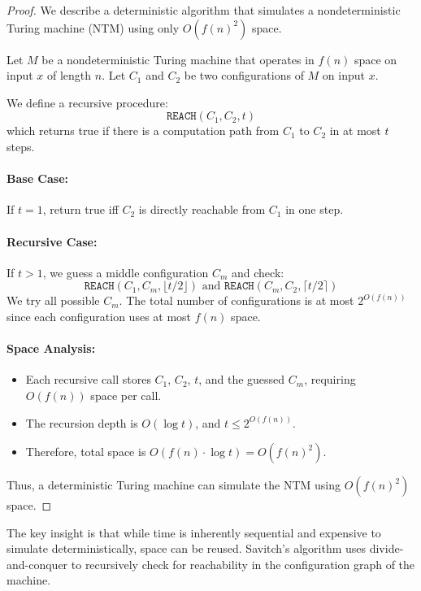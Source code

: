 \begin{proof}
We describe a deterministic algorithm that simulates a nondeterministic Turing machine (NTM) using only $O(f(n)^2)$ space.

Let $M$ be a nondeterministic Turing machine that operates in $f(n)$ space on input $x$ of length $n$. Let $C_1$ and $C_2$ be two configurations of $M$ on input $x$.

We define a recursive procedure:
\[
\texttt{REACH}(C_1, C_2, t)
\]
which returns true if there is a computation path from $C_1$ to $C_2$ in at most $t$ steps.

\paragraph{Base Case:} If $t = 1$, return true iff $C_2$ is directly reachable from $C_1$ in one step.

\paragraph{Recursive Case:} If $t > 1$, we guess a middle configuration $C_m$ and check:
\[
\texttt{REACH}(C_1, C_m, \lfloor t/2 \rfloor) \text{ and } \texttt{REACH}(C_m, C_2, \lceil t/2 \rceil)
\]
We try all possible $C_m$. The total number of configurations is at most $2^{O(f(n))}$ since each configuration uses at most $f(n)$ space.

\paragraph{Space Analysis:}
\begin{itemize}
    \item Each recursive call stores $C_1$, $C_2$, $t$, and the guessed $C_m$, requiring $O(f(n))$ space per call.
    \item The recursion depth is $O(\log t)$, and $t \leq 2^{O(f(n))}$.
    \item Therefore, total space is $O(f(n) \cdot \log t) = O(f(n)^2)$.
\end{itemize}

Thus, a deterministic Turing machine can simulate the NTM using $O(f(n)^2)$ space.
\end{proof}

\begin{remark}
The key insight is that while time is inherently sequential and expensive to simulate deterministically, space can be reused. Savitch's algorithm uses divide-and-conquer to recursively check for reachability in the configuration graph of the machine.
\end{remark}


